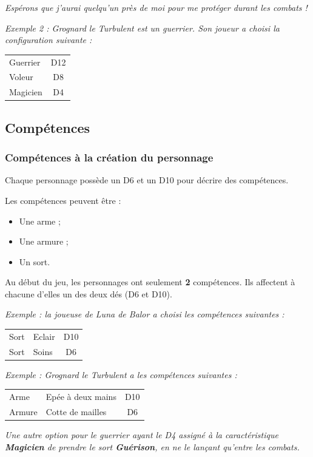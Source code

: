 \documentclass[a4paper, 11pt, twoside]{article}
\begin{document}
\emph{Espérons que j'aurai quelqu'un près de moi pour me protéger durant les combats !}

\emph{Exemple 2 : Grognard le Turbulent est un guerrier. Son joueur a choisi la configuration suivante :}

\begin{longtable}{l|c}
\hline
Guerrier & D12\\
Voleur & D8\\
Magicien & D4\\
\end{longtable}


\subsection{Compétences}
\label{sec:org7f3aec1}
\subsubsection{Compétences à la création du personnage}
\label{sec:org934ea53}

Chaque personnage possède un D6 et un D10 pour décrire des compétences.

Les compétences peuvent être :
\begin{itemize}
\item Une arme ;
\item Une armure ;
\item Un sort.
\end{itemize}

Au début du jeu, les personnages ont seulement \textbf{2} compétences. Ils affectent à chacune d'elles un des deux dés (D6 et D10).

\emph{Exemple : la joueuse de Luna de Balor a choisi les compétences suivantes :}

\begin{longtable}{l|l|c}
\hline
Sort & Eclair & D10\\
Sort & Soins & D6\\
\end{longtable}

\emph{Exemple : Grognard le Turbulent a les compétences suivantes :}

\begin{longtable}{l|l|c}
\hline
Arme & Epée à deux mains & D10\\
Armure & Cotte de mailles & D6\\
\end{longtable}

\emph{Une autre option pour le guerrier ayant le D4 assigné à la caractéristique \textbf{Magicien} de prendre le sort \textbf{Guérison}, en ne le lançant qu'entre les combats.}
\end{document}
